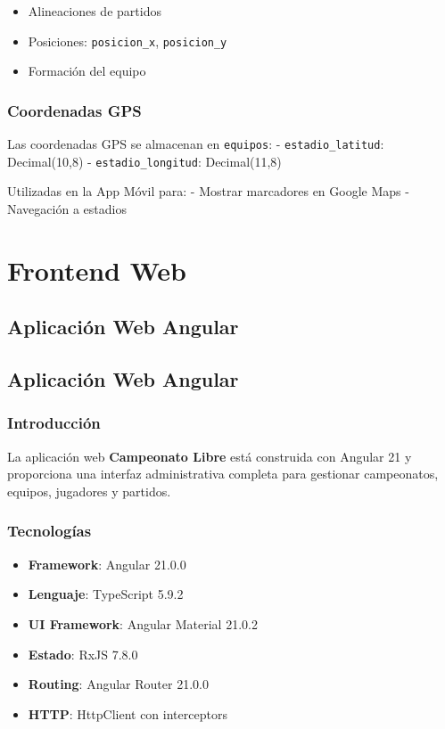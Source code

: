 \documentclass[
  spanish,
  11pt,
  letterpaper,
]{book}
\providecommand{\tightlist}{%
  \setlength{\itemsep}{0pt}\setlength{\parskip}{0pt}}
\begin{document}
\begin{itemize}
\tightlist
\item
  Alineaciones de partidos
\item
  Posiciones: \texttt{posicion\_x}, \texttt{posicion\_y}
\item
  Formación del equipo
\end{itemize}

\section{Coordenadas GPS}\label{coordenadas-gps}

Las coordenadas GPS se almacenan en \texttt{equipos}: -
\texttt{estadio\_latitud}: Decimal(10,8) - \texttt{estadio\_longitud}:
Decimal(11,8)

Utilizadas en la App Móvil para: - Mostrar marcadores en Google Maps -
Navegación a estadios

\part{Frontend Web}

\chapter{Aplicación Web Angular}\label{aplicaciuxf3n-web-angular}

\chapter{Aplicación Web Angular}\label{aplicaciuxf3n-web-angular-1}

\section{Introducción}\label{introducciuxf3n-7}

La aplicación web \textbf{Campeonato Libre} está construida con Angular
21 y proporciona una interfaz administrativa completa para gestionar
campeonatos, equipos, jugadores y partidos.

\section{Tecnologías}\label{tecnologuxedas-1}

\begin{itemize}
\tightlist
\item
  \textbf{Framework}: Angular 21.0.0
\item
  \textbf{Lenguaje}: TypeScript 5.9.2
\item
  \textbf{UI Framework}: Angular Material 21.0.2
\item
  \textbf{Estado}: RxJS 7.8.0
\item
  \textbf{Routing}: Angular Router 21.0.0
\item
  \textbf{HTTP}: HttpClient con interceptors
\end{itemize}
\end{document}
